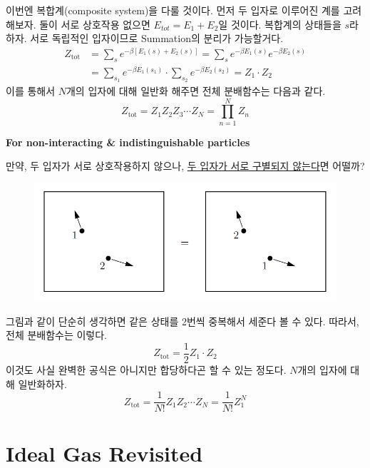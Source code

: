 \documentclass{article}
\begin{document}
이번엔 복합계(composite system)을 다룰 것이다. 먼저 두 입자로 이루어진 계를 고려해보자. 둘이 서로 상호작용 없으면 $E_{tot} = E_1 + E_2$일 것이다. 복합계의 상태들을 $s$라 하자. 서로 독립적인 입자이므로 Summation의 분리가 가능할거다.
\begin{align} \nonumber
    Z_{\text{tot}} &= \sum_s e^{-\beta [E_1(s) + E_2(s)]} = \sum_s e^{-\beta E_1 (s)} e^{-\beta E_2 (s)}\\
    &= \sum_{s_1} e^{-\beta E_1 (s_1)} \cdot \sum_{s_2} e^{-\beta E_2 (s_2)} = Z_1 \cdot Z_2
\end{align}
이를 통해서 $N$개의 입자에 대해 일반화 해주면 전체 분배함수는 다음과 같다.
\begin{equation}
    Z_{\text{tot}} = Z_1 Z_2 Z_3 \cdots Z_N = \prod_{n=1}^N Z_n
\end{equation}


\noindent
\textbf{For non-interacting \& indistinguishable particles}

만약, 두 입자가 서로 상호작용하지 않으나, \underline{두 입자가 서로 구별되지 않는다}면 어떨까?  

\begin{figure}[h]
    \centering
    \includegraphics[width=0.7\linewidth]{images/fig6_1.png}
\end{figure}

그림과 같이 단순히 생각하면 같은 상태를 2번씩 중복해서 세준다 볼 수 있다. 따라서, 전체 분배함수는 이렇다.
\begin{equation}
    Z_{\text{tot}} = \frac12 Z_1 \cdot Z_2
\end{equation}
이것도 사실 완벽한 공식은 아니지만 합당하다곤 할 수 있는 정도다. $N$개의 입자에 대해 일반화하자.
\begin{equation}
    Z_{\text{tot}} = \frac{1}{N!} Z_1 Z_2 \cdots Z_N = \frac{1}{N!} Z_1^N
\end{equation}

\newpage

\section{Ideal Gas Revisited}
\end{document}
